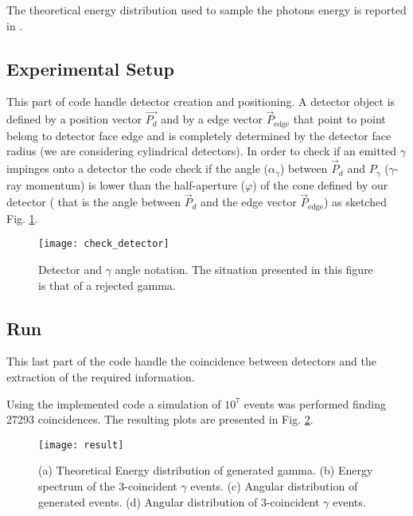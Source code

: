 The theoretical energy distribution used to sample the photons energy is reported in \cite{ore1949three}.

\subsection*{Experimental Setup}

This part of code handle detector creation and positioning. A detector object is defined by a position vector $\vec{P_d}$ and by a edge vector $\vec{P}_{\text{edge}}$ that point to point belong to detector face edge and is completely determined by the detector face radius (we are considering cylindrical detectors). In order to check if an emitted $\gamma$ impinges onto a detector the code check if the angle ($\alpha_\gamma$) between $\vec{P}_d$ and $P_\gamma$ ($\gamma$-ray momentum) is lower than the half-aperture ($\varphi$) of the cone defined by our detector ( that is the angle between $\vec{P}_d$ and the edge vector $\vec{P}_{\text{edge}}$) as sketched Fig. \ref{Fig: angle det check}.

\begin{figure}[H]
\centering
\texttt{[image: check\_detector]}
\caption{Detector and $\gamma$ angle notation. The situation presented in this figure is that of a rejected gamma.}
\label{Fig: angle det check}
\end{figure}


\subsection*{Run}

This last part of the code handle the coincidence between detectors and the extraction of the required information.

Using the implemented code a simulation of $10^7$ events was performed finding 27293 coincidences. The resulting plots are presented in Fig. \ref{Fig: simulation result}.

\begin{figure}[H]
\centering
\texttt{[image: result]}
\caption{(a) Theoretical Energy distribution of generated gamma. (b) Energy spectrum of the 3-coincident $\gamma$ events. (c) Angular distribution of generated events. (d) Angular distribution of 3-coincident $\gamma$ events.}
\label{Fig: simulation result}
\end{figure}




